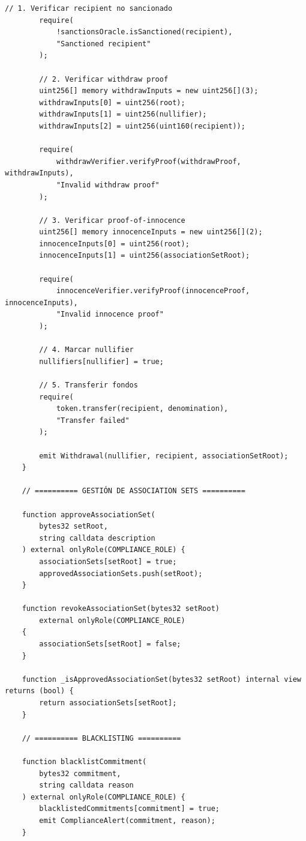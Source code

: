 \documentclass[11pt,a4paper,twoside]{book}
\theoremstyle{definition}
\theoremstyle{remark}
\begin{document}
\begin{lstlisting}[language=Solidity, caption={Regulatory-Compliant Mixer Contract}]
        // 1. Verificar recipient no sancionado
        require(
            !sanctionsOracle.isSanctioned(recipient),
            "Sanctioned recipient"
        );
        
        // 2. Verificar withdraw proof
        uint256[] memory withdrawInputs = new uint256[](3);
        withdrawInputs[0] = uint256(root);
        withdrawInputs[1] = uint256(nullifier);
        withdrawInputs[2] = uint256(uint160(recipient));
        
        require(
            withdrawVerifier.verifyProof(withdrawProof, withdrawInputs),
            "Invalid withdraw proof"
        );
        
        // 3. Verificar proof-of-innocence
        uint256[] memory innocenceInputs = new uint256[](2);
        innocenceInputs[0] = uint256(root);
        innocenceInputs[1] = uint256(associationSetRoot);
        
        require(
            innocenceVerifier.verifyProof(innocenceProof, innocenceInputs),
            "Invalid innocence proof"
        );
        
        // 4. Marcar nullifier
        nullifiers[nullifier] = true;
        
        // 5. Transferir fondos
        require(
            token.transfer(recipient, denomination),
            "Transfer failed"
        );
        
        emit Withdrawal(nullifier, recipient, associationSetRoot);
    }
    
    // ========== GESTIÓN DE ASSOCIATION SETS ==========
    
    function approveAssociationSet(
        bytes32 setRoot,
        string calldata description
    ) external onlyRole(COMPLIANCE_ROLE) {
        associationSets[setRoot] = true;
        approvedAssociationSets.push(setRoot);
    }
    
    function revokeAssociationSet(bytes32 setRoot) 
        external onlyRole(COMPLIANCE_ROLE) 
    {
        associationSets[setRoot] = false;
    }
    
    function _isApprovedAssociationSet(bytes32 setRoot) internal view returns (bool) {
        return associationSets[setRoot];
    }
    
    // ========== BLACKLISTING ==========
    
    function blacklistCommitment(
        bytes32 commitment,
        string calldata reason
    ) external onlyRole(COMPLIANCE_ROLE) {
        blacklistedCommitments[commitment] = true;
        emit ComplianceAlert(commitment, reason);
    }
    

\end{lstlisting}
\end{document}
